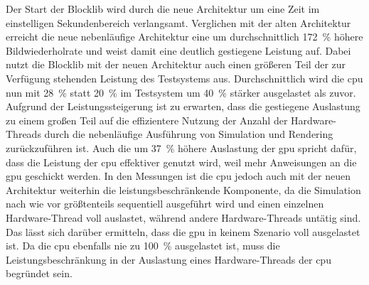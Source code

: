 Der Start der Blocklib wird durch die neue Architektur um eine Zeit im einstelligen Sekundenbereich verlangsamt. Verglichen mit der alten Architektur erreicht die neue nebenläufige Architektur eine um durchschnittlich \SI{172}{\percent} höhere Bildwiederholrate und weist damit eine deutlich gestiegene Leistung auf. Dabei nutzt die Blocklib mit der neuen Architektur auch einen größeren Teil der zur Verfügung stehenden Leistung des Testsystems aus. Durchschnittlich wird die \ac{cpu} nun mit \SI{28}{\percent} statt \SI{20}{\percent} im Testsystem um \SI{40}{\percent} stärker ausgelastet als zuvor. Aufgrund der Leistungssteigerung ist zu erwarten, dass die gestiegene Auslastung zu einem großen Teil auf die effizientere Nutzung der Anzahl der Hardware-Threads durch die nebenläufige Ausführung von Simulation und Rendering zurückzuführen ist. Auch die um \SI{37}{\percent} höhere Auslastung der \ac{gpu} spricht dafür, dass die Leistung der \ac{cpu} effektiver genutzt wird, weil mehr Anweisungen an die \ac{gpu} geschickt werden. In den Messungen ist die \ac{cpu} jedoch auch mit der neuen Architektur weiterhin die leistungsbeschränkende Komponente, da die Simulation nach wie vor größtenteils sequentiell ausgeführt wird und einen einzelnen Hardware-Thread voll auslastet, während andere Hardware-Threads untätig sind. Das lässt sich darüber ermitteln, dass die \ac{gpu} in keinem Szenario voll ausgelastet ist. Da die \ac{cpu} ebenfalls nie zu \SI{100}{\percent} ausgelastet ist, muss die Leistungsbeschränkung in der Auslastung eines Hardware-Threads der \ac{cpu} begründet sein.